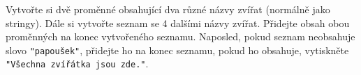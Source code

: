 \question[50]
Vytvořte si dvě proměnné obsahující dva různé názvy zvířat (normálně jako
stringy). Dále si vytvořte seznam se 4 dalšími názvy zvířat. Přidejte obsah obou
proměnných na konec vytvořeného seznamu. Naposled, pokud seznam neobsahuje slovo
\texttt{"papoušek"}, přidejte ho na konec seznamu, pokud ho obsahuje, vytiskněte
\texttt{"Všechna zvířátka jsou zde."}.